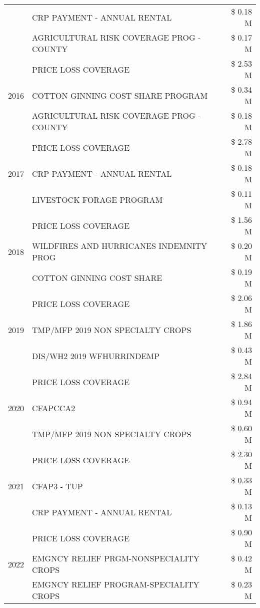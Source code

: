 \begin{tabular}{llr}
 & CRP PAYMENT - ANNUAL RENTAL & \$ 0.18 M \\
 & AGRICULTURAL RISK COVERAGE PROG - COUNTY & \$ 0.17 M \\
\cline{1-3}
\multirow[t]{3}{*}{2016} & PRICE LOSS COVERAGE & \$ 2.53 M \\
 & COTTON GINNING COST SHARE PROGRAM & \$ 0.34 M \\
 & AGRICULTURAL RISK COVERAGE PROG - COUNTY & \$ 0.18 M \\
\cline{1-3}
\multirow[t]{3}{*}{2017} & PRICE LOSS COVERAGE & \$ 2.78 M \\
 & CRP PAYMENT - ANNUAL RENTAL & \$ 0.18 M \\
 & LIVESTOCK FORAGE PROGRAM & \$ 0.11 M \\
\cline{1-3}
\multirow[t]{3}{*}{2018} & PRICE LOSS COVERAGE & \$ 1.56 M \\
 & WILDFIRES AND HURRICANES INDEMNITY PROG & \$ 0.20 M \\
 & COTTON GINNING COST SHARE & \$ 0.19 M \\
\cline{1-3}
\multirow[t]{3}{*}{2019} & PRICE LOSS COVERAGE & \$ 2.06 M \\
 & TMP/MFP 2019 NON SPECIALTY CROPS & \$ 1.86 M \\
 & DIS/WH2 2019 WFHURRINDEMP & \$ 0.43 M \\
\cline{1-3}
\multirow[t]{3}{*}{2020} & PRICE LOSS COVERAGE & \$ 2.84 M \\
 & CFAPCCA2 & \$ 0.94 M \\
 & TMP/MFP 2019 NON SPECIALTY CROPS & \$ 0.60 M \\
\cline{1-3}
\multirow[t]{3}{*}{2021} & PRICE LOSS COVERAGE & \$ 2.30 M \\
 & CFAP3 - TUP & \$ 0.33 M \\
 & CRP PAYMENT - ANNUAL RENTAL & \$ 0.13 M \\
\cline{1-3}
\multirow[t]{3}{*}{2022} & PRICE LOSS COVERAGE & \$ 0.90 M \\
 & EMGNCY RELIEF PRGM-NONSPECIALITY CROPS & \$ 0.42 M \\
 & EMGNCY RELIEF PROGRAM-SPECIALITY CROPS & \$ 0.23 M \\
\cline{1-3}
\bottomrule
\end{tabular}
